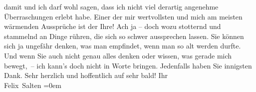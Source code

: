 \begin{ledgroupsized}[t]{13cm}
               damit und ich darf wohl sagen, dass ich nicht viel derartig angenehme Überraschungen
               erlebt habe. Einer der mir wertvollsten und mich am meisten wärmenden Aussprüche ist
               der Ihre! Ach ja – doch wozu stotternd und stammelnd an Dinge rühren, die sich so
               schwer aussprechen lassen. Sie können sich ja ungefähr denken, was man empfindet,
               wenn man so alt werden durfte. Und wenn Sie auch nicht genau alles denken oder
               wissen, was gerade mich bewegt, – ich kann’s doch nicht in Worte bringen. Jedenfalls
               haben Sie innigsten Dank. Sehr herzlich und hoffentlich auf sehr bald! \pend
           \pstart
           Ihr
               {\\[\baselineskip]}\spacefill\mbox{Felix Salten}\pend
           \leftskip=0em{}
         
         \endnumbering{}\end{ledgroupsized}\begin{anhang}\end{anhang}\newcommand{\dateiname}{L03587}\newcommand{\titel}{Felix Salten an Arthur Schnitzler, 21. 9. 1929}\newcommand{\editorInnen}{Martin Anton Müller und Laura Untner}
      